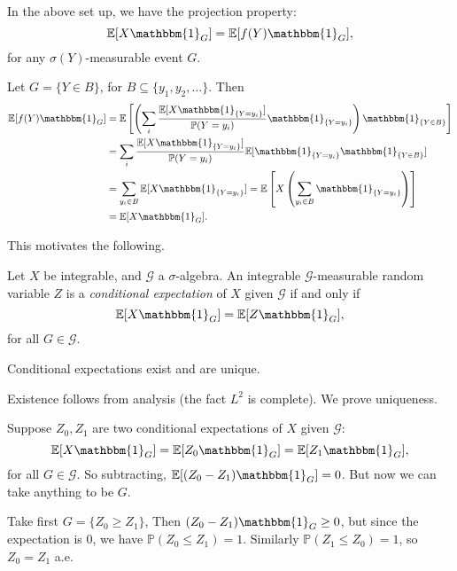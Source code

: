 \documentclass[12pt]{article}
\begin{document}
\begin{proposition}
	In the above set up, we have the projection property:
	\[
	\mathbb{E}[X \mathbbm{1}_{G}] = \mathbb{E}[f(Y) \mathbbm{1}_{G}],
	\]
	for any $\sigma(Y)$-measurable event $G$.
\end{proposition}

\begin{proofbox}
	Let $G = \{Y \in B\}$, for $B \subseteq \{y_1, y_2, \ldots\}$. Then
	\begin{align*}
		\mathbb{E}[f(Y) \mathbbm{1}_{G}] &= \mathbb{E}\left[ \left( \sum_i \frac{\mathbb{E}[X \mathbbm{1}_{\{Y = y_i\}}]}{\mathbb{P}(Y = y_i)} \mathbbm{1}_{\{Y = y_i\}} \right) \mathbbm{1}_{\{Y \in B\}} \right] \\
						 &= \sum_i \frac{\mathbb{E}[X \mathbbm{1}_{\{Y = y_i\}}]}{\mathbb{P}(Y = y_i)} \mathbb{E}[\mathbbm{1}_{\{Y = y_i\}} \mathbbm{1}_{\{Y \in B\}}] \\
						 &= \sum_{y_i \in B} \mathbb{E}[X \mathbbm{1}_{\{Y = y_i\}}] = \mathbb{E}\left[ X \left( \sum_{y_i \in B} \mathbbm{1}_{\{Y = y_i\}} \right) \right] \\
						 &= \mathbb{E}[X \mathbbm{1}_{G}].
	\end{align*}
\end{proofbox}

This motivates the following.

\begin{definition}
	Let $X$ be integrable, and $\mathcal{G}$ a $\sigma$-algebra. An integrable $\mathcal{G}$-measurable random variable $Z$ is a \emph{conditional expectation} of $X$ given $\mathcal{G}$ if and only if
	\[
	\mathbb{E}[X \mathbbm{1}_{G}] = \mathbb{E}[Z \mathbbm{1}_{G}],
	\]
	for all $G \in \mathcal{G}$.
\end{definition}

\begin{theorem}
	Conditional expectations exist and are unique.
\end{theorem}

\begin{proofbox}
	Existence follows from analysis (the fact $L^2$ is complete). We prove uniqueness.

	Suppose $Z_0, Z_1$ are two conditional expectations of $X$ given $\mathcal{G}$:
	\[
	\mathbb{E}[X \mathbbm{1}_{G}] = \mathbb{E}[Z_0 \mathbbm{1}_{G}] = \mathbb{E}[Z_1 \mathbbm{1}_{G}],
	\]
	for all $G \in \mathcal{G}$. So subtracting, $\mathbb{E}[(Z_0 - Z_1)\mathbbm{1}_{G}] = 0$. But now we can take anything to be $G$.

	Take first $G = \{Z_0 \geq Z_1\}$, Then $(Z_0 - Z_1) \mathbbm{1}_{G} \geq 0$, but since the expectation is 0, we have $\mathbb{P}(Z_0 \leq Z_1) = 1$. Similarly $\mathbb{P}(Z_1 \leq Z_0) = 1$, so $Z_0 = Z_1$ a.e.
\end{proofbox}
\end{document}
